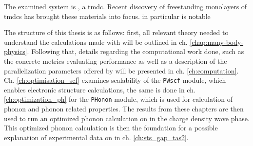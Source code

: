 \documentclass[main.tex]{subfiles}
\begin{document}
The examined system is \TaS, a \acrfull{tmdc}.
Recent discovery of freestanding monolayers of \acrshort{tmdc}s \cite{novoselov_two-dimensional_2005} has brought these materials into focus.
\TaS in particular is notable 

The structure of this thesis is as follows:
first, all relevant theory needed to understand the calculations made with \QE will be outlined in ch. \ref{chap:many-body-physics}.
Following that, details regarding the computational work done, such as the concrete metrics evaluating performance as well as a description of the parallelization parameters offered by \QE will be presented in ch. \ref{ch:computation}.
Ch. \ref{ch:optimisation_scf} examines scalability of the \texttt{PWscf} module, which enables electronic structure calculations, the same is done in ch. \ref{ch:optimization_ph} for the \texttt{PHonon} module, which is used for calculation of phonon and phonon related properties. 
The results from these chapters are then used to run an optimized phonon calculation on \TaS in the charge density wave phase.
This optimized phonon calculation is then the foundation for a possible explanation of experimental data on \TaS in ch. \ref{ch:sts_gap_tas2}.
\end{document}
